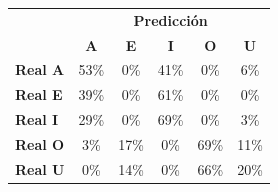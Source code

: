 \begin{tabular}{lccccc}
\toprule
 & \multicolumn{5}{c}{\textbf{Predicción}} \\
 & \textbf{A} & \textbf{E} & \textbf{I} & \textbf{O} & \textbf{U} \\
\midrule
\textbf{Real A} & \cellcolor[rgb]{0.63,0.63,1.00} \color{white} 53\% & \cellcolor[rgb]{1.00,1.00,1.00}  0\% & \cellcolor[rgb]{0.71,0.71,1.00}  41\% & \cellcolor[rgb]{1.00,1.00,1.00}  0\% & \cellcolor[rgb]{0.96,0.96,1.00}  6\% \\
\textbf{Real E} & \cellcolor[rgb]{0.73,0.73,1.00}  39\% & \cellcolor[rgb]{1.00,1.00,1.00}  0\% & \cellcolor[rgb]{0.57,0.57,1.00} \color{white} 61\% & \cellcolor[rgb]{1.00,1.00,1.00}  0\% & \cellcolor[rgb]{1.00,1.00,1.00}  0\% \\
\textbf{Real I} & \cellcolor[rgb]{0.80,0.80,1.00}  29\% & \cellcolor[rgb]{1.00,1.00,1.00}  0\% & \cellcolor[rgb]{0.52,0.52,1.00} \color{white} 69\% & \cellcolor[rgb]{1.00,1.00,1.00}  0\% & \cellcolor[rgb]{0.98,0.98,1.00}  3\% \\
\textbf{Real O} & \cellcolor[rgb]{0.98,0.98,1.00}  3\% & \cellcolor[rgb]{0.88,0.88,1.00}  17\% & \cellcolor[rgb]{1.00,1.00,1.00}  0\% & \cellcolor[rgb]{0.52,0.52,1.00} \color{white} 69\% & \cellcolor[rgb]{0.92,0.92,1.00}  11\% \\
\textbf{Real U} & \cellcolor[rgb]{1.00,1.00,1.00}  0\% & \cellcolor[rgb]{0.90,0.90,1.00}  14\% & \cellcolor[rgb]{1.00,1.00,1.00}  0\% & \cellcolor[rgb]{0.54,0.54,1.00} \color{white} 66\% & \cellcolor[rgb]{0.86,0.86,1.00}  20\% \\
\bottomrule
\end{tabular}